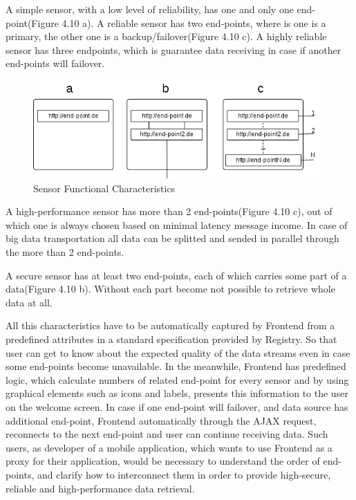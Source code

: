   A simple sensor, with a low level of reliability, has one and only one end-point(Figure 4.10 a). A reliable sensor has two end-points, where is one is a primary, the other one is a backup/failover(Figure 4.10 c). A highly reliable sensor has three endpoints, which is guarantee data receiving in case if another end-points will failover. 
     \begin{figure}[!ht]
     \centering
     \includegraphics[scale=0.6]{images/FuncCharacteristics.png}   
     \caption[MVC Pattern]{Sensor Functional Characteristics}                      
     \end{figure}
  A high-performance sensor has more than 2 end-points(Figure 4.10 c), out of which one is always chosen based on minimal latency message income. In case of big data transportation all data can be splitted and sended in parallel through the more than 2 end-points. 
    
  A secure sensor has at least two end-points, each of which carries some part of a data(Figure 4.10 b). Without each part become not possible to retrieve whole data at all. 

 All this characteristics have to be automatically captured by Frontend from a predefined attributes in a standard specification provided by Registry. So that user can get to know about the expected quality of the data streams even in case some end-points become unavailable. In the meanwhile, Frontend has predefined logic, which calculate numbers of related end-point for every sensor and by using graphical elements such as icons and labels, presents this information to the user on the welcome screen. In case if one end-point will failover, and data source has additional end-point, Frontend automatically through the AJAX request, reconnects to the next end-point and user can continue receiving data. Such users, as developer of a mobile application, which wants to use Frontend as a proxy for their application, would be necessary to understand the order of end-points, and clarify how to interconnect them in order to provide high-secure, reliable and high-performance data retrieval.

